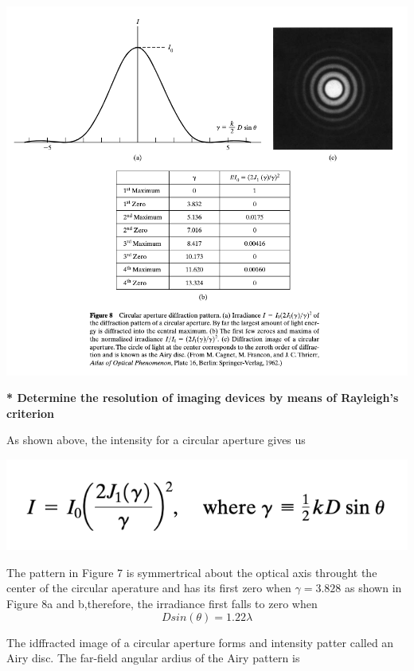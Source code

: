 \documentclass[10pt]{article}
\newcommand*{\lo}[1]{
    \textbf{* #1} \newline
}
\begin{document}
\begin{center}
    \includegraphics[scale = .7]{imgs/j.png}
\end{center}

\lo{Determine the resolution of imaging devices by means of Rayleigh’s criterion}

As shown above, the intensity for a circular aperture gives us

\begin{center}
    \includegraphics*[scale = .8]{imgs/intesity-from-circ-app.png}
\end{center}

The pattern in Figure 7 is symmertrical about the optical axis throught the center of the circular aperature and has its first zero when $\gamma = 3.828$ as shown in Figure 8a and b,therefore, the irradiance first falls to zero when 
\[Dsin(\theta) = 1.22 \lambda\]

\newpage

The idffracted image of a circular aperture forms and intensity patter called an Airy disc. The far-field angular ardius of the Airy pattern is 
\end{document}
